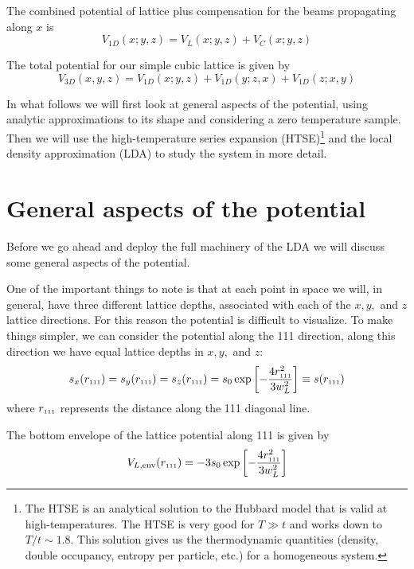 \documentclass[11pt,letter]{article}
\newcommand{\rdiag}{\ensuremath{ r_{\text{\tiny{111}}} } }
\begin{document}
The combined potential of lattice plus compensation for the beams propagating
along $x$ is 
\begin{equation}
  V_{1D}( x; y ,z ) = V_{L}(x; y,z) + V_{C}(x; y, z)
\end{equation}

The total potential for our simple cubic lattice is given by 
\begin{equation}
  V_{3D}(x, y, z)  =  V_{1D}( x; y,z) + V_{1D}( y; z,x) + V_{1D}(z; x,y)
\end{equation}


In what follows we will first look at general aspects of the potential, using
analytic approximations to its shape and considering a zero temperature sample.
Then we will use the high-temperature series expansion (HTSE)\footnote{ The
HTSE is  an analytical solution to the Hubbard model that is valid at
high-temperatures.  The HTSE is very good for $T \gg t$ and works down to $T/t
\sim 1.8$.  This solution gives us the thermodynamic quantities (density,
double occupancy, entropy per particle, etc.)  for a homogeneous system.}  and
the local density approximation (LDA) to study the system in more detail. 


\section{General aspects of the potential }

Before we go ahead and deploy the full machinery of the LDA we will discuss
some general aspects of the potential. 

One of the important things to note is that at each point in space  we will, in
general, have three different lattice depths, associated with each of the
$x,y,$ and $z$ lattice directions.  For this reason the potential is difficult
to visualize.  To make things simpler, we can consider the potential along the
111 direction,    along this direction we have equal
lattice depths in $x,y,$ and $z$:
\begin{equation} 
  s_{x}( \rdiag ) = s_{y}( \rdiag ) = s_{z}( \rdiag ) = 
  s_{0} \exp \left[ - \frac{ 4 \rdiag^{2} }{3 w_{L}^{2} } \right]  
  \equiv s(\rdiag) 
\end{equation}
where $\rdiag$ represents the distance along the 111 diagonal line.

The bottom envelope of the lattice potential along 111 is given by 
\begin{equation}
  V_{L,\text{env}}( \rdiag )  = -3 s_{0} 
  \exp \left[ - \frac{ 4 \rdiag^{2} }{3 w_{L}^{2} } \right]  
\end{equation} 
\end{document}
